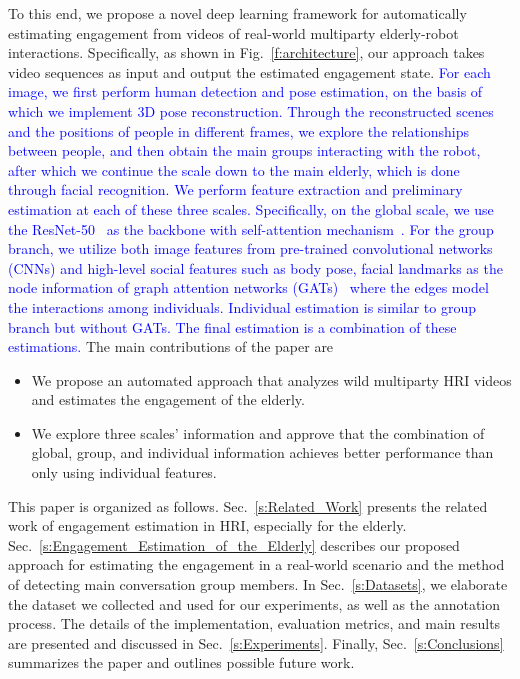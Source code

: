 \documentclass[10pt,journal,compsoc]{IEEEtran}
\begin{document}
To this end, we propose a novel deep learning framework for automatically estimating engagement from videos of real-world multiparty elderly-robot interactions. Specifically, as shown in Fig.~\ref{f:architecture}, our approach takes video sequences as input and output the estimated engagement state. \textcolor{blue}{For each image, we first perform human detection and pose estimation, on the basis of which we implement 3D pose reconstruction. Through the reconstructed scenes and the positions of people in different frames, we explore the relationships between people, and then obtain the main groups interacting with the robot, after which we continue the scale down to the main elderly, which is done through facial recognition. We perform feature extraction and preliminary estimation at each of these three scales. Specifically, on the global scale, we use the ResNet-50~\cite{He2016Deep} as the backbone with self-attention mechanism~\cite{Wang2018NonLocal}. For the group branch, we utilize both image features from pre-trained convolutional networks (CNNs) and high-level social features such as body pose, facial landmarks as the node information of graph attention networks (GATs)~\cite{Velivckovic2017Graph} where the edges model the interactions among individuals. Individual estimation is similar to group branch but without GATs. The final estimation is a combination of these estimations.} The main contributions of the paper are

\begin{itemize}
\item We propose an automated approach that analyzes wild multiparty HRI videos and estimates the engagement of the elderly.
\item We explore three scales' information and approve that the combination of global, group, and individual information achieves better performance than only using individual features.
\end{itemize}

This paper is organized as follows. Sec.~\ref{s:Related_Work} presents the related work of engagement estimation in HRI, especially for the elderly. Sec.~\ref{s:Engagement_Estimation_of_the_Elderly} describes our proposed approach for estimating the engagement in a real-world scenario and the method of detecting main conversation group members. In Sec.~\ref{s:Datasets}, we elaborate the dataset we collected and used for our experiments, as well as the annotation process. The details of the implementation, evaluation metrics, and main results are presented and discussed in Sec.~\ref{s:Experiments}. 
Finally, Sec.~\ref{s:Conclusions} summarizes the paper and outlines possible future work.
\end{document}

